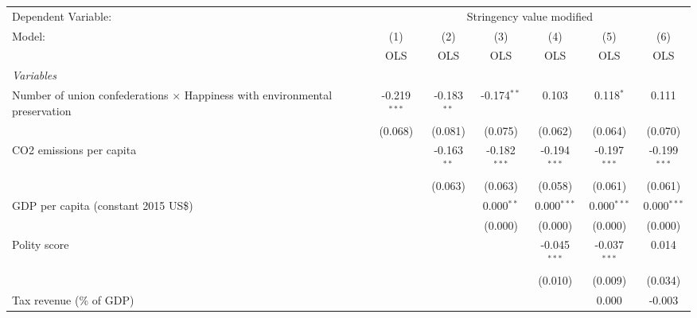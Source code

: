 
\begingroup
\centering
\begin{tabular}{lcccccc}
   \toprule
   Dependent Variable: & \multicolumn{6}{c}{Stringency value modified}\\
   Model:                                                                             & (1)            & (2)           & (3)            & (4)            & (5)            & (6)\\  
                                                                                      &  OLS           & OLS           & OLS            & OLS            & OLS            & OLS\\  
   \midrule
   \emph{Variables}\\
   Number of union confederations $\times$ Happiness with environmental preservation  & -0.219$^{***}$ & -0.183$^{**}$ & -0.174$^{**}$  & 0.103          & 0.118$^{*}$    & 0.111\\   
                                                                                      & (0.068)        & (0.081)       & (0.075)        & (0.062)        & (0.064)        & (0.070)\\   
   CO2 emissions per capita                                                           &                & -0.163$^{**}$ & -0.182$^{***}$ & -0.194$^{***}$ & -0.197$^{***}$ & -0.199$^{***}$\\   
                                                                                      &                & (0.063)       & (0.063)        & (0.058)        & (0.061)        & (0.061)\\   
   GDP per capita (constant 2015 US\$)                                                &                &               & 0.000$^{**}$   & 0.000$^{***}$  & 0.000$^{***}$  & 0.000$^{***}$\\   
                                                                                      &                &               & (0.000)        & (0.000)        & (0.000)        & (0.000)\\   
   Polity score                                                                       &                &               &                & -0.045$^{***}$ & -0.037$^{***}$ & 0.014\\   
                                                                                      &                &               &                & (0.010)        & (0.009)        & (0.034)\\   
   Tax revenue (\% of GDP)                                                            &                &               &                &                & 0.000          & -0.003\\   

\end{tabular}
